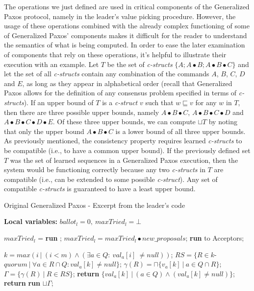 The operations we just defined are used in critical components of the Generalized Paxos protocol, namely in the leader's value picking procedure. However, the usage of these operations combined with the already complex functioning of some of Generalized Paxos' components makes it difficult for the reader to understand the semantics of what is being computed. In order to ease the later examination of components that rely on these operations, it's helpful to illustrate their execution with an example. Let $T$ be the set of \textit{c-structs} $\{A ; A \bullet B ; A \bullet B \bullet C\}$ and let the set of all \textit{c-structs} contain any combination of the commands $A$, $B$, $C$, $D$ and $E$, as long as they appear in alphabetical order (recall that Generalized Paxos allows for the definition of any consensus problem specified in terms of \textit{c-structs}). If an upper bound of $T$ is a \textit{c-struct} $v$ such that $w \sqsubseteq v$ for any $w$ in $T$, then there are three possible upper bounds, namely $A \bullet B \bullet C$, $A \bullet B \bullet C \bullet D$ and $A \bullet B \bullet C \bullet D \bullet E$. Of these three upper bounds, we can compute $\sqcup T$ by noting that only the upper bound $A \bullet B \bullet C$ is a lower bound of all three upper bounds. As previously mentioned, the consistency property requires learned \textit{c-structs} to be compatible (i.e., to have a common upper bound). If the previously defined set $T$ was the set of learned sequences in a Generalized Paxos execution, then the system would be functioning correctly because any two \textit{c-structs} in $T$ are compatible (i.e., can be extended to some possible \textit{c-struct}). Any set of compatible \textit{c-structs} is guaranteed to have a least upper bound.\par 
\begin{algorithm}
	\caption{Original Generalized Paxos - Excerpt from the leader's code}
	\label{leader_excerpt}
	\textbf{Local variables:} $ballot_l = 0,\ maxTried_l = \bot$
	\begin{algorithmic}[1]
		\State $maxTried_l$ = \textbf{run} ;
		\State $maxTried_l = maxTried_l \bullet new\_proposals$;
		\State \textbf{run}  to Acceptors;
		\EndFunction
		
		\State
		\State $k = max(i\ |\ (i < m) \wedge (\exists a \in Q :\ val_a[i]\ \neq null))$;
		\State $RS = \{R \in k$-$quorum\ |\ \forall a \in R \cap Q : val_a[k] \neq null\}$;
		\State $\gamma(R) = \sqcap \{v_a[k]\ |\ a \in Q \cap R \}$;
		\State $\Gamma = \{\gamma(R)\ |\ R \in RS \}$;
		\State
		\State \textbf{return} $\{val_a[k]\ |\ (a \in Q) \wedge (val_a[k] \neq null)\}$;
		\Else
		\State \textbf{return} \textbf{run} $\sqcup \Gamma$;
		\EndIf
		\EndFunction
		
	\end{algorithmic}
\end{algorithm}
